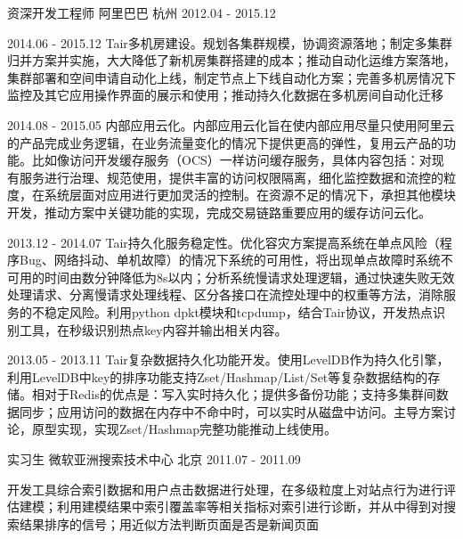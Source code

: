 \begin{cventries}
  \cventry
    {资深开发工程师} %
    {阿里巴巴} %
    {杭州} %
    {2012.04 - 2015.12} %
    {
      \begin{cvitems} %
        \item {2014.06 - 2015.12 Tair多机房建设。规划各集群规模，协调资源落地；制定多集群归并方案并实施，大大降低了新机房集群搭建的成本；推动自动化运维方案落地，集群部署和空间申请自动化上线，制定节点上下线自动化方案；完善多机房情况下监控及其它应用操作界面的展示和使用；推动持久化数据在多机房间自动化迁移}
        \item {2014.08 - 2015.05 内部应用云化。内部应用云化旨在使内部应用尽量只使用阿里云的产品完成业务逻辑，在业务流量变化的情况下提供更高的弹性，复用云产品的功能。比如像访问开发缓存服务（OCS）一样访问缓存服务，具体内容包括：对现有服务进行治理、规范使用，提供丰富的访问权限隔离，细化监控数据和流控的粒度，在系统层面对应用进行更加灵活的控制。在资源不足的情况下，承担其他模块开发，推动方案中关键功能的实现，完成交易链路重要应用的缓存访问云化。}
        \item {2013.12 - 2014.07 Tair持久化服务稳定性。优化容灾方案提高系统在单点风险（程序Bug、网络抖动、单机故障）的情况下系统的可用性，将出现单点故障时系统不可用的时间由数分钟降低为8s以内；分析系统慢请求处理逻辑，通过快速失败无效处理请求、分离慢请求处理线程、区分各接口在流控处理中的权重等方法，消除服务的不稳定风险。利用python dpkt模块和tcpdump，结合Tair协议，开发热点识别工具，在秒级识别热点key内容并输出相关内容。}
        \item {2013.05 - 2013.11 Tair复杂数据持久化功能开发。使用LevelDB作为持久化引擎，利用LevelDB中key的排序功能支持Zset/Hashmap/List/Set等复杂数据结构的存储。相对于Redis的优点是：写入实时持久化；提供多备份功能；支持多集群间数据同步；应用访问的数据在内存中不命中时，可以实时从磁盘中访问。主导方案讨论，原型实现，实现Zset/Hashmap完整功能推动上线使用。}
      \end{cvitems}
    }

  \cventry
    {实习生} %
    {微软亚洲搜索技术中心} %
    {北京} %
    {2011.07 - 2011.09} %
    {
      \begin{cvitems} %
        \item {开发工具综合索引数据和用户点击数据进行处理，在多级粒度上对站点行为进行评估建模；利用建模结果中索引覆盖率等相关指标对索引进行诊断，并从中得到对搜索结果排序的信号；用近似方法判断页面是否是新闻页面}
      \end{cvitems}
    }

\end{cventries}
